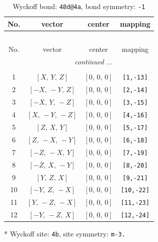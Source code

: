 \documentclass[fleqn,8pt]{jsarticle}
\begin{document}
\renewcommand{\arraystretch}{1.2}
\begin{longtable}{cccc}
\caption{Wyckoff bond: {\tt 48d@4a}, bond symmetry: {\tt -1}}
 \\
 \hline \hline
No. & vector & center & mapping \\ \hline \endfirsthead

\multicolumn{3}{l}{\tablename\ \thetable{}} \\
 \hline \hline
No. & vector & center & mapping \\ \hline \endhead

 \hline \hline
\multicolumn{3}{r}{\footnotesize\it continued ...} \\ \endfoot

 \hline \hline
\multicolumn{3}{r}{} \\ \endlastfoot

1 & $\left[ X,\, Y,\, Z \right]$ & $\left[ 0,\, 0,\, 0 \right]$ & {\tt [1,-13]} \\ \hline
2 & $\left[ - X,\, - Y,\, Z \right]$ & $\left[ 0,\, 0,\, 0 \right]$ & {\tt [2,-14]} \\ \hline
3 & $\left[ - X,\, Y,\, - Z \right]$ & $\left[ 0,\, 0,\, 0 \right]$ & {\tt [3,-15]} \\ \hline
4 & $\left[ X,\, - Y,\, - Z \right]$ & $\left[ 0,\, 0,\, 0 \right]$ & {\tt [4,-16]} \\ \hline
5 & $\left[ Z,\, X,\, Y \right]$ & $\left[ 0,\, 0,\, 0 \right]$ & {\tt [5,-17]} \\ \hline
6 & $\left[ Z,\, - X,\, - Y \right]$ & $\left[ 0,\, 0,\, 0 \right]$ & {\tt [6,-18]} \\ \hline
7 & $\left[ - Z,\, - X,\, Y \right]$ & $\left[ 0,\, 0,\, 0 \right]$ & {\tt [7,-19]} \\ \hline
8 & $\left[ - Z,\, X,\, - Y \right]$ & $\left[ 0,\, 0,\, 0 \right]$ & {\tt [8,-20]} \\ \hline
9 & $\left[ Y,\, Z,\, X \right]$ & $\left[ 0,\, 0,\, 0 \right]$ & {\tt [9,-21]} \\ \hline
10 & $\left[ - Y,\, Z,\, - X \right]$ & $\left[ 0,\, 0,\, 0 \right]$ & {\tt [10,-22]} \\ \hline
11 & $\left[ Y,\, - Z,\, - X \right]$ & $\left[ 0,\, 0,\, 0 \right]$ & {\tt [11,-23]} \\ \hline
12 & $\left[ - Y,\, - Z,\, X \right]$ & $\left[ 0,\, 0,\, 0 \right]$ & {\tt [12,-24]} \\
\end{longtable}
* Wyckoff site: {\tt 4b}, site symmetry: {\tt m-3.}
\renewcommand{\arraystretch}{1.2}
\end{document}
